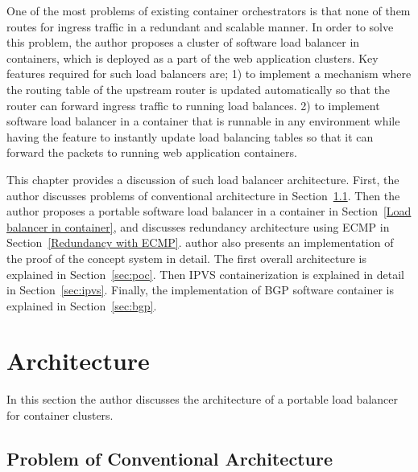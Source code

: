 
One of the most  problems of existing container orchestrators is that none of them  routes for ingress traffic in a redundant and scalable manner.
In order to solve this problem, the author proposes a cluster of software load balancer in containers, which is deployed as a part of the web application clusters.
Key features required for such load balancers are;
1) to implement a mechanism where the routing table of the upstream router is updated automatically so that the router can forward ingress traffic to running load balances.
2) to implement software load balancer in a container that is runnable in any environment while having the feature to instantly update load balancing tables so that it can forward the packets to running web application containers.

This chapter provides a discussion of such load balancer architecture.
First, the author discusses problems of conventional architecture in Section~\ref{Problem of Conventional Architecture}.
Then the author proposes a portable software load balancer in a container in Section~\ref{Load balancer in container}, and discusses redundancy architecture using ECMP in Section~\ref{Redundancy with ECMP}.
%
 author also presents an implementation of the proof of the concept  system in detail.
The first overall architecture is explained in Section~\ref{sec:poc}.
Then IPVS containerization is explained in detail in Section~\ref{sec:ipvs}.
Finally, the implementation of BGP software container is explained in Section~\ref{sec:bgp}.

\section{Architecture}

In this section the author discusses the architecture of a portable load balancer for container clusters.

\subsection{Problem of Conventional Architecture}\label{Problem of Conventional Architecture}

